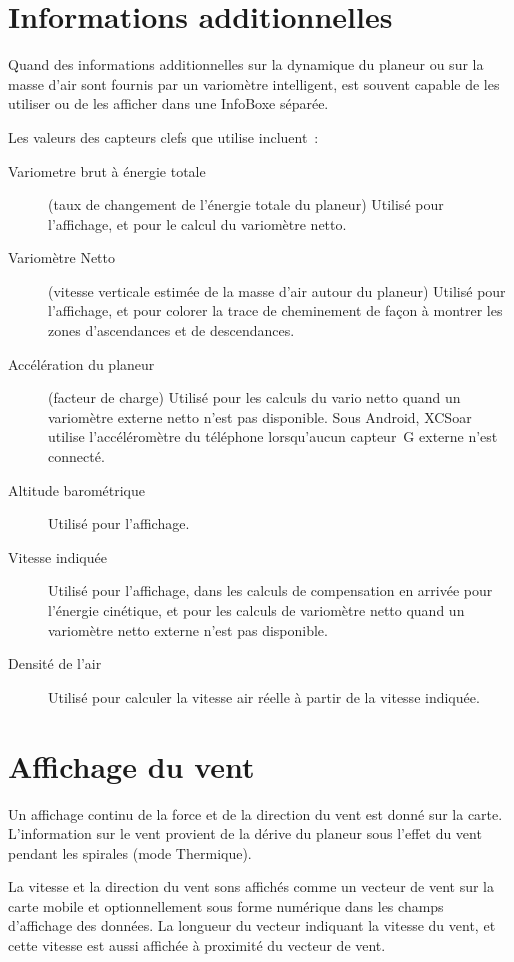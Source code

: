 \section{Informations additionnelles}

Quand des informations additionnelles sur la dynamique du planeur ou sur la masse d'air sont fournis par un variomètre intelligent, \xc{} est souvent capable de les utiliser ou de les afficher dans une InfoBoxe séparée. 

Les valeurs des capteurs clefs que \xc{} utilise incluent~:
\begin{description}
\item[Variometre brut à énergie totale] (taux de changement de l'énergie totale du planeur) Utilisé pour l'affichage, et pour le calcul du variomètre netto.
\item[Variomètre Netto] (vitesse verticale estimée de la masse d'air autour du planeur) Utilisé pour l'affichage, et pour colorer la trace de cheminement de façon à montrer les zones d'ascendances et de descendances.
\item[Accélération du planeur] (facteur de charge) Utilisé pour les calculs du vario netto quand un variomètre externe netto n'est pas disponible.
Sous Android, XCSoar utilise l'accéléromètre du téléphone lorsqu'aucun capteur~G externe n'est connecté.
\item[Altitude barométrique] Utilisé pour l'affichage.
\item[Vitesse indiquée] Utilisé pour l'affichage, dans les calculs de compensation en arrivée pour l'énergie cinétique, et pour les calculs de variomètre netto quand un variomètre netto externe n'est pas disponible.
\item[Densité de l'air] Utilisé pour calculer la vitesse air réelle à partir de la vitesse indiquée.
\end{description}

\section{Affichage du vent}

Un affichage continu de la force et de la direction du vent est donné sur la carte.
L'information sur le vent provient de la dérive du planeur sous l'effet du vent pendant les spirales (mode Thermique).

La vitesse et la direction du vent sons affichés comme un vecteur de vent sur la carte mobile et optionnellement sous forme numérique dans les champs d'affichage des données.
La longueur du vecteur indiquant la vitesse du vent, et cette vitesse est aussi affichée à proximité du vecteur de vent.

